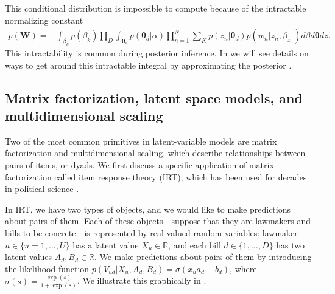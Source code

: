 This conditional distribution is impossible to compute because of the
intractable normalizing constant
\begin{align} 
  p(\bm W) = & 
  \int_{\beta_k} p(\beta_k)
  \prod_D \int_{\bm \theta_d} p(\bm \theta_d | \alpha) 
  \prod_{n=1}^N \sum_K p(z_n | \bm \theta_d) p(w_n | z_n, \beta_{z_n}) d\beta d\bm \theta dz.
\end{align}
This intractability is common during posterior inference.  In
 we will see details on ways to get around
this intractable integral by approximating the posterior \cite{blei:2003}.



\subsection{Matrix factorization, latent space models, and
  multidimensional scaling}

Two of the most common primitives in latent-variable models are matrix
factorization \citep{salakhutdinov:2008a} and multidimensional scaling,
which describe relationships between pairs of items, or dyads. We
first discuss a specific application of matrix factorization called
item response theory (IRT), which has been used for decades in
political science
\citep{clinton:2004,martin:2002,poole:1991,enelow:1984,albert:1992}.

In IRT, we have two types of objects, and we would like to make
predictions about pairs of them.  Each of these objects---suppose that
they are lawmakers and bills to be concrete---is represented by
real-valued random variables: lawmaker $u \in \{ u=1, \ldots, U \}$
has a latent value $X_u \in \mathbb{R}$, and each bill $d \in \{ 1,
\ldots, D \}$ has two latent values $A_d,B_d \in \mathbb{R}$.  We make
predictions about pairs of them by introducing the likelihood function
$p(V_{ud} | X_u, A_d, B_d) = \sigma( x_u a_d + b_d )$, where
$\sigma(s) = \frac{\exp(s)}{ 1 + \exp(s) }$.  We illustrate this
graphically in .

